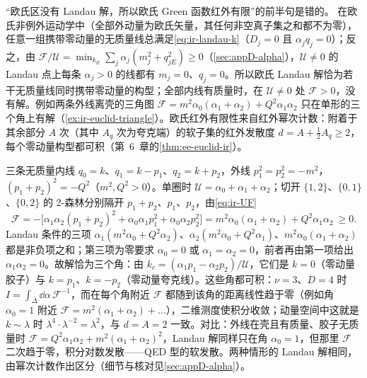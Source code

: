 \begin{remark}\label{rem:ir-euclid-corners}
“欧氏区没有 Landau 解，所以欧氏 Green 函数红外有限”的前半句是错的。%
在欧氏非例外运动学中（全部外动量为欧氏矢量，其任何非空真子集之和都不为零），任意一组携带零动量的无质量线总满足\cref{eq:ir-landau-k}（$D_j=0$ 且 $\alpha_jq_j=0$）；反之，由 $\mathcal F/\mathcal U=\min_{k_E}\sum_j\alpha_j(m_j^2+q_{jE}^2)\ge0$（\cref{sec:appD-alpha}），$\mathcal U\ne0$ 的 Landau 点上每条 $\alpha_j>0$ 的线都有 $m_j=0$、$q_j=0$。所以欧氏 Landau 解恰为若干无质量线同时携带零动量的构型；全部内线有质量时，在 $\mathcal U\ne0$ 处 $\mathcal F>0$，没有解。例如两条外线离壳的三角图 $\mathcal F=m^2\alpha_0(\alpha_1+\alpha_2)+Q^2\alpha_1\alpha_2$ 只在单形的三个角上有解（\cref{ex:ir-euclid-triangle}）。欧氏红外有限性来自红外幂次计数：附着于其余部分 $A$ 次（其中 $A_q$ 次为夸克端）的软子集的红外发散度 $d=A+\frac12A_q\ge2$，每个零动量构型都可积（第~6~章的\cref{thm:ee-euclid-ir}）。
\end{remark}


\begin{example}\label{ex:ir-euclid-triangle}
三条无质量内线 $q_0=k$、$q_1=k-p_1$、$q_2=k+p_2$，外线 $p_1^2=p_2^2=-m^2$，$(p_1+p_2)^2=-Q^2$（$m^2,Q^2>0$）。单圈时 $\mathcal U=\alpha_0+\alpha_1+\alpha_2$；切开 $\{1,2\}$、$\{0,1\}$、$\{0,2\}$ 的 2-森林分别隔开 $p_1+p_2$、$p_1$、$p_2$，由\cref{eq:ir-UF}
\[
\mathcal F=-\big[\alpha_1\alpha_2(p_1+p_2)^2+\alpha_0\alpha_1p_1^2+\alpha_0\alpha_2p_2^2\big]=m^2\alpha_0(\alpha_1+\alpha_2)+Q^2\alpha_1\alpha_2\ \ge0 .
\]
Landau 条件的三项 $\alpha_1(m^2\alpha_0+Q^2\alpha_2)$、$\alpha_2(m^2\alpha_0+Q^2\alpha_1)$、$m^2\alpha_0(\alpha_1+\alpha_2)$ 都是非负项之和；第三项为零要求 $\alpha_0=0$ 或 $\alpha_1=\alpha_2=0$，前者再由第一项给出 $\alpha_1\alpha_2=0$。故解恰为三个角：由 $k_c=(\alpha_1p_1-\alpha_2p_2)/\mathcal U$，它们是 $k=0$（零动量胶子）与 $k=p_1$、$k=-p_2$（零动量夸克线）。这些角都可积：$\nu=3$、$D=4$ 时 $I=\int_{\bar\Delta}\dd\alpha\,\mathcal F^{-1}$，而在每个角附近 $\mathcal F$ 都随到该角的距离线性趋于零（例如角 $\alpha_0=1$ 附近 $\mathcal F=m^2(\alpha_1+\alpha_2)+\dots$），二维测度使积分收敛；动量空间中这就是 $k\sim\lambda$ 时 $\lambda^4\cdot\lambda^{-2}=\lambda^2$，与 $d=A=2$ 一致。对比：外线在壳且有质量、胶子无质量时 $\mathcal F=Q^2\alpha_1\alpha_2+m^2(\alpha_1+\alpha_2)^2$，Landau 解同样只在角 $\alpha_0=1$，但那里 $\mathcal F$ 二次趋于零，积分对数发散——QED 型的软发散。两种情形的 Landau 解相同，由幂次计数作出区分（细节与核对见\cref{sec:appD-alpha}）。
\end{example}
